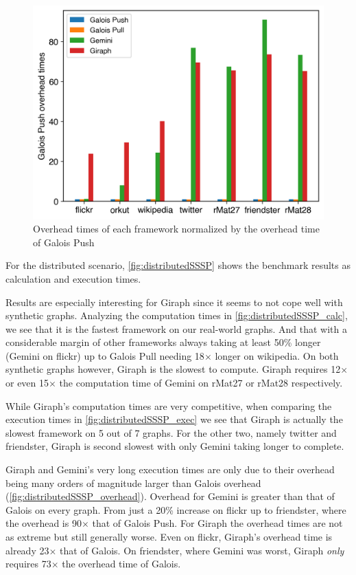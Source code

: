 \begin{figure}
	\includegraphics[width=\linewidth]{../../plots/distributedSSSP_overheadTimeNormalizedToGalois.png}
	\caption{Overhead times of each framework normalized by the overhead time of Galois Push}
	\label{fig:distributedSSSP_overhead}
\end{figure}

For the distributed scenario, \autoref{fig:distributedSSSP} shows the benchmark results as calculation and execution times. 

Results are especially interesting for Giraph since it seems to not cope well with synthetic graphs. Analyzing the computation times in \autoref{fig:distributedSSSP_calc}, we see that it is the fastest framework on our real-world graphs. And that with a considerable margin of other frameworks always taking at least 50\% longer (Gemini on flickr) up to Galois Pull needing 18$\times$ longer on wikipedia.  
On both synthetic graphs however, Giraph is the slowest to compute. Giraph requires 12$\times$ or even 15$\times$ the computation time of Gemini on rMat27 or rMat28 respectively.

While Giraph's computation times are very competitive, when comparing the execution times in \autoref{fig:distributedSSSP_exec} we see that Giraph is actually the slowest framework on 5 out of 7 graphs. For the other two, namely twitter and friendster, Giraph is second slowest with only Gemini taking longer to complete.

Giraph and Gemini's very long execution times are only due to their overhead being many orders of magnitude larger than Galois overhead (\autoref{fig:distributedSSSP_overhead}).
Overhead for Gemini is greater than that of Galois on every graph. From just a 20\% increase on flickr up to friendster, where the overhead is 90$\times$ that of Galois Push.
For Giraph the overhead times are not as extreme but still generally worse. Even on flickr, Giraph's overhead time is already 23$\times$ that of Galois. On friendster, where Gemini was worst, Giraph \emph{only} requires 73$\times$ the overhead time of Galois.

